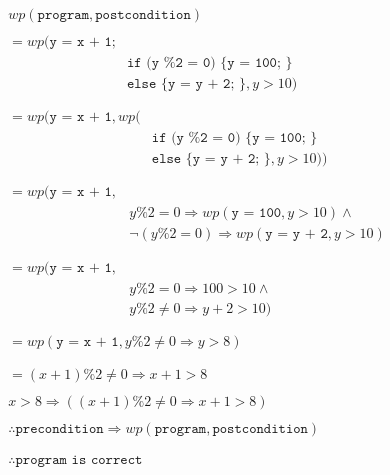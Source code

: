 \documentclass[landscape]{cheat}
\begin{document}
\begin{multicols*}{3}
\begin{gather}
\nonumber
\begin{split}
    wp(\texttt{program}, \texttt{postcondition})
\end{split}
\\
\nonumber
\begin{split}
    = wp(\texttt{y = x + 1;} \\
        &\texttt{if (y \% 2 = 0) \{ y = 100; \}} \\
        &\texttt{else \{ y = y + 2; \}}, y > 10) \\
\end{split}
\\
\nonumber
\begin{split}
    = wp(\texttt{y = x + 1}, wp( \\
        &\texttt{if (y \% 2 = 0) \{ y = 100; \}} \\
        &\texttt{else \{ y = y + 2; \}}, y > 10)) \\
\end{split}
\\
\nonumber
\begin{split}
    = wp(\texttt{y = x + 1}, \\
        &y \% 2 = 0 \Rightarrow wp(\texttt{y = 100}, y > 10) \land \\
        &\lnot(y \% 2 = 0) \Rightarrow wp(\texttt{y = y + 2}, y > 10) \\
\end{split}
\\
\nonumber
\begin{split}
    = wp(\texttt{y = x + 1}, \\
        &y \% 2 = 0 \Rightarrow 100 > 10 \land \\
        &y \% 2 \neq 0 \Rightarrow y + 2 > 10) \\
\end{split}
\\
\nonumber
\begin{split}
    = wp(\texttt{y = x + 1}, y \% 2 \neq 0 \Rightarrow y > 8) \\
\end{split}
\\
\nonumber
\begin{split}
    = (x + 1) \% 2 \neq 0 \Rightarrow x + 1 > 8
\end{split}
\\
\nonumber
\begin{split}
    x > 8 \Rightarrow ((x + 1) \% 2 \neq 0 \Rightarrow x + 1 > 8)
\end{split}
\\
\nonumber
\begin{split}
    \therefore \texttt{precondition} \Rightarrow wp(\texttt{program}, \texttt{postcondition}) \\
\end{split} \\
\nonumber
\begin{split}
    \therefore \texttt{program is correct} \\
\end{split}
\end{gather}


\end{multicols*}
\end{document}
